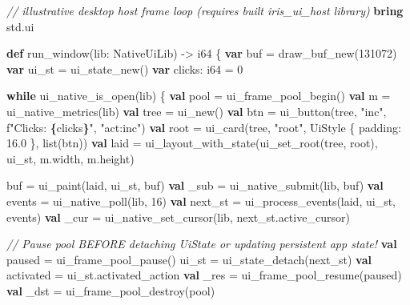 \documentclass[
  english,
  oneside]{book}
\newenvironment{Shaded}{\begin{snugshade}}{\end{snugshade}}
\newcommand{\CommentTok}[1]{\textcolor[rgb]{0.42,0.60,0.33}{\textit{#1}}}
\newcommand{\ControlFlowTok}[1]{\textcolor[rgb]{0.77,0.53,0.75}{\textbf{#1}}}
\newcommand{\DataTypeTok}[1]{\textcolor[rgb]{0.31,0.79,0.69}{#1}}
\newcommand{\DecValTok}[1]{\textcolor[rgb]{0.71,0.81,0.66}{#1}}
\newcommand{\FloatTok}[1]{\textcolor[rgb]{0.71,0.81,0.66}{#1}}
\newcommand{\KeywordTok}[1]{\textcolor[rgb]{0.34,0.61,0.84}{\textbf{#1}}}
\newcommand{\NormalTok}[1]{\textcolor[rgb]{0.83,0.83,0.83}{#1}}
\newcommand{\OperatorTok}[1]{\textcolor[rgb]{0.83,0.83,0.83}{#1}}
\newcommand{\StringTok}[1]{\textcolor[rgb]{0.81,0.57,0.47}{#1}}
\begin{document}
\begin{Shaded}
\begin{Highlighting}[]
\CommentTok{// illustrative desktop host frame loop (requires built \textasciigrave{}iris\_ui\_host\textasciigrave{} library)}
\KeywordTok{bring}\NormalTok{ std}\OperatorTok{.}\NormalTok{ui}

\KeywordTok{def}\NormalTok{ run\_window(lib: NativeUiLib) }\OperatorTok{{-}\textgreater{}} \DataTypeTok{i64}\NormalTok{ \{}
    \KeywordTok{var}\NormalTok{ buf }\OperatorTok{=}\NormalTok{ draw\_buf\_new(}\DecValTok{131072}\NormalTok{)}
    \KeywordTok{var}\NormalTok{ ui\_st }\OperatorTok{=}\NormalTok{ ui\_state\_new()}
    \KeywordTok{var}\NormalTok{ clicks: }\DataTypeTok{i64} \OperatorTok{=} \DecValTok{0}

    \ControlFlowTok{while}\NormalTok{ ui\_native\_is\_open(lib) \{}
        \KeywordTok{val}\NormalTok{ pool }\OperatorTok{=}\NormalTok{ ui\_frame\_pool\_begin()}
        \KeywordTok{val}\NormalTok{ m }\OperatorTok{=}\NormalTok{ ui\_native\_metrics(lib)}
        \KeywordTok{val}\NormalTok{ tree }\OperatorTok{=}\NormalTok{ ui\_new()}
        \KeywordTok{val}\NormalTok{ btn }\OperatorTok{=}\NormalTok{ ui\_button(tree, }\StringTok{"inc"}\NormalTok{, }\StringTok{f"Clicks: }\ControlFlowTok{\{}\NormalTok{clicks}\ControlFlowTok{\}}\StringTok{"}\NormalTok{, }\StringTok{"act:inc"}\NormalTok{)}
        \KeywordTok{val}\NormalTok{ root }\OperatorTok{=}\NormalTok{ ui\_card(tree, }\StringTok{"root"}\NormalTok{, UiStyle \{ padding: }\FloatTok{16.0}\NormalTok{ \}, }\DataTypeTok{list}\NormalTok{(btn))}
        \KeywordTok{val}\NormalTok{ laid }\OperatorTok{=}\NormalTok{ ui\_layout\_with\_state(ui\_set\_root(tree, root), ui\_st, m}\OperatorTok{.}\NormalTok{width, m}\OperatorTok{.}\NormalTok{height)}

\NormalTok{        buf }\OperatorTok{=}\NormalTok{ ui\_paint(laid, ui\_st, buf)}
        \KeywordTok{val}\NormalTok{ \_sub }\OperatorTok{=}\NormalTok{ ui\_native\_submit(lib, buf)}
        \KeywordTok{val}\NormalTok{ events }\OperatorTok{=}\NormalTok{ ui\_native\_poll(lib, }\DecValTok{16}\NormalTok{)}
        \KeywordTok{val}\NormalTok{ next\_st }\OperatorTok{=}\NormalTok{ ui\_process\_events(laid, ui\_st, events)}
        \KeywordTok{val}\NormalTok{ \_cur }\OperatorTok{=}\NormalTok{ ui\_native\_set\_cursor(lib, next\_st}\OperatorTok{.}\NormalTok{active\_cursor)}

        \CommentTok{// Pause pool BEFORE detaching UiState or updating persistent app state!}
        \KeywordTok{val}\NormalTok{ paused }\OperatorTok{=}\NormalTok{ ui\_frame\_pool\_pause()}
\NormalTok{        ui\_st }\OperatorTok{=}\NormalTok{ ui\_state\_detach(next\_st)}
        \KeywordTok{val}\NormalTok{ activated }\OperatorTok{=}\NormalTok{ ui\_st}\OperatorTok{.}\NormalTok{activated\_action}
        \KeywordTok{val}\NormalTok{ \_res }\OperatorTok{=}\NormalTok{ ui\_frame\_pool\_resume(paused)}
        \KeywordTok{val}\NormalTok{ \_dst }\OperatorTok{=}\NormalTok{ ui\_frame\_pool\_destroy(pool)}


\end{Highlighting}
\end{Shaded}
\end{document}
